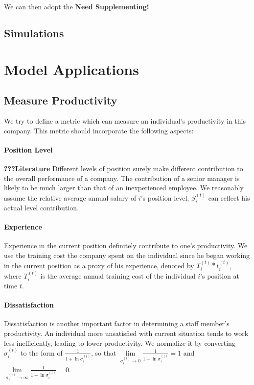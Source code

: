 \documentclass[tcn = 37075, sheet = true, abstract = true]{mcmthesis}
\begin{document}
We can then adopt the \textbf{Need Supplementing!}


\subsection{Simulations}


\section{Model Applications}

\subsection{Measure Productivity}

We try to define a metric which can measure an individual's productivity in this company. This metric should incorporate the following aspects:
\paragraph{Position Level}
\textbf{???Literature} Different levels of position surely make different contribution to the overall performance of a company. The contribution of a senior manager is likely to be much larger than that of an inexperienced employee. We reasonably assume the relative average annual salary of $i$'s position level, $S_i^{(t)}$ can reflect his actual level contribution.
\paragraph{Experience}
Experience in the current position definitely contribute to one's productivity. We use the training cost the company spent on the individual since he began working in the current position as a proxy of his experience, denoted by $T_i^{(t)}*t_i^{(t)}$, where $T_i^{(t)}$ is the average annual training cost of the individual $i$'s position at time $t$.
\paragraph{Dissatisfaction}
Dissatisfaction is another important factor in determining a staff member's productivity. An individual more unsatisfied with current situation tends to work less inefficiently, leading to lower productivity. We normalize it by converting $\sigma_i^{(t)}$ to the form of $\displaystyle \frac{1}{1+\ln{\sigma_i^{(t)}}}$, so that $\lim\limits_{\sigma_i^{(t)}\rightarrow 0} \displaystyle \frac{1}{1+\ln{\sigma_i^{(t)}}}=1$ and $\lim\limits_{\sigma_i^{(t)}\rightarrow \infty} \displaystyle \frac{1}{1+\ln{\sigma_i^{(t)}}}=0$. \\
\end{document}
